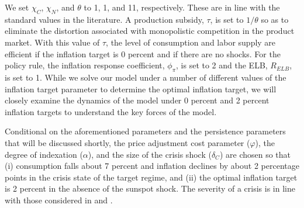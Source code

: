 \documentclass[11pt]{article}
\begin{document}
	We set $\chi_{C}$, $\chi_{N}$, and $\theta$ to 1, 1, and 11, respectively. These are in line with the standard values in the literature. A production subsidy, $\tau$, is set to $1/\theta$ so as to eliminate the distortion associated with monopolistic competition in the product market. With this value of $\tau$, the level of consumption and labor supply are efficient if the inflation target is 0 percent and if there are no shocks. For the policy rule, the inflation response coefficient, $\phi_{\pi}$, is set to 2 and the ELB, $R_{ELB}$, is set to 1. While we solve our model under a number of different values of the inflation target parameter to determine the optimal inflation target, we will closely examine the dynamics of the model under 0 percent and 2 percent inflation targets to understand the key forces of the model.
	
	Conditional on the aforementioned parameters and the persistence parameters that will be discussed shortly, the price adjustment cost parameter ($\varphi$), the degree of indexation ($\alpha$), and the size of the crisis shock ($\delta_{C}$) are chosen so that (i) consumption falls about 7 percent and inflation declines by about 2 percentage points in the crisis state of the target regime, and (ii) the optimal inflation target is 2 percent in the absence of the sunspot shock. The severity of a crisis is in line with those considered in \citet{BonevaBraunWaki2016} and \citet{HillsNakata2018}. 
	
\end{document}
